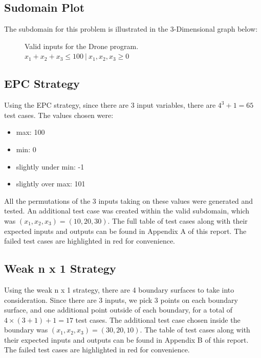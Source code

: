 \documentclass[letterpaper]{article}
\begin{document}
\subsection{Sudomain Plot}
The subdomain for this problem is illustrated in the 3-Dimensional graph below:
\begin{figure}[H]
	\centering
{}
\caption{Valid inputs for the Drone program. $x_1 + x_2 + x_3 \leq 100\ |\ x_1, x_2, x_3 \geq 0$}
\end{figure}

\subsection{EPC Strategy}
Using the EPC strategy, since there are 3 input variables, there are
$4^3 + 1 = 65$ test cases. The values chosen were:
\begin{itemize}
	\item max: 100
	\item min: 0
	\item slightly under min: -1
	\item slightly over max: 101
\end{itemize}
All the permutations of the 3 inputs taking on these values were generated
and tested. An additional test case was created within the valid subdomain,
which was $(x_1, x_2, x_3) = (10, 20, 30)$. The full table of test cases
along with their expected inputs and outputs can be found in Appendix A of this
report. The failed test cases are highlighted in red for convenience.

\subsection{Weak n x 1 Strategy}
Using the weak n x 1 strategy, there are 4 boundary surfaces to take into
consideration. Since there are 3 inputs, we pick 3 points on each boundary
surface, and one additional point outside of each boundary, for a total of
$4\times (3 + 1) + 1 = 17$ test cases. The additional test case chosen inside
the boundary was $(x_1, x_2, x_3) = (30, 20, 10)$. The table of test cases
along with their expected inputs and outputs can be found in Appendix B of this
report. The failed test cases are highlighted in red for convenience.
\end{document}

